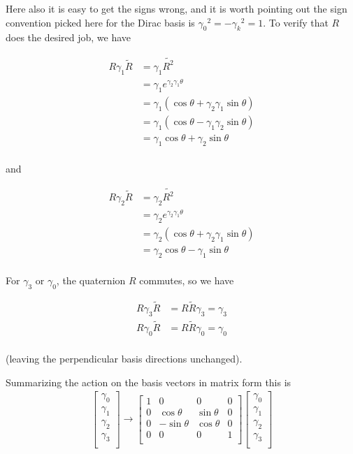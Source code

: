 \documentclass{article}
\begin{document}
Here also it is easy to get the signs wrong, and it is worth pointing out the sign convention picked here for the Dirac basis is ${\gamma_0}^2 = -{\gamma_k}^2 = 1$.  To verify that $R$ does the desired job, we have

\begin{align*}
R \gamma_1 \tilde{R}
&=
\gamma_1 \tilde{R^2} \\
&=
\gamma_1 e^{\gamma_2 \gamma_1 \theta} \\
&=
\gamma_1 (\cos\theta + \gamma_2 \gamma_1 \sin\theta) \\
&=
\gamma_1 (\cos\theta - \gamma_1 \gamma_2 \sin\theta) \\
&=
\gamma_1 \cos\theta + \gamma_2 \sin\theta \\
\end{align*}

and 

\begin{align*}
R \gamma_2 \tilde{R}
&=
\gamma_2 \tilde{R^2} \\
&=
\gamma_2 e^{\gamma_2 \gamma_1 \theta} \\
&=
\gamma_2 (\cos\theta + \gamma_2 \gamma_1 \sin\theta) \\
&=
\gamma_2 \cos\theta - \gamma_1 \sin\theta \\
\end{align*}

For $\gamma_3$ or $\gamma_0$, the quaternion $R$ commutes, so we have

\begin{align*}
R \gamma_3 \tilde{R} &= R \tilde{R} \gamma_3 = \gamma_3 \\
R \gamma_0 \tilde{R} &= R \tilde{R} \gamma_0 = \gamma_0 \\
\end{align*}

(leaving the perpendicular basis directions unchanged).

Summarizing the action on the basis vectors in matrix form this is
\begin{align*}
\begin{bmatrix}
\gamma_0 \\
\gamma_1 \\
\gamma_2 \\
\gamma_3 \\
\end{bmatrix}
\rightarrow
\begin{bmatrix}
1 & 0 & 0 & 0 \\
0 & \cos\theta & \sin\theta & 0 \\
0 & -\sin\theta & \cos\theta & 0 \\
0 & 0 & 0 & 1 \\
\end{bmatrix}
\begin{bmatrix}
\gamma_0 \\
\gamma_1 \\
\gamma_2 \\
\gamma_3 \\
\end{bmatrix}
\end{align*}
\end{document}
